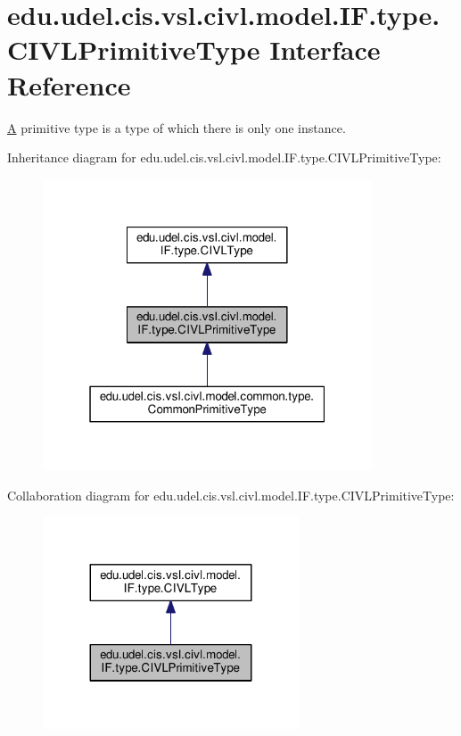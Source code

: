 \hypertarget{interfaceedu_1_1udel_1_1cis_1_1vsl_1_1civl_1_1model_1_1IF_1_1type_1_1CIVLPrimitiveType}{}\section{edu.\+udel.\+cis.\+vsl.\+civl.\+model.\+I\+F.\+type.\+C\+I\+V\+L\+Primitive\+Type Interface Reference}
\label{interfaceedu_1_1udel_1_1cis_1_1vsl_1_1civl_1_1model_1_1IF_1_1type_1_1CIVLPrimitiveType}


\hyperlink{structA}{A} primitive type is a type of which there is only one instance.  




Inheritance diagram for edu.\+udel.\+cis.\+vsl.\+civl.\+model.\+I\+F.\+type.\+C\+I\+V\+L\+Primitive\+Type\+:
\nopagebreak
\begin{figure}[H]
\begin{center}
\leavevmode
\includegraphics[width=277pt]{interfaceedu_1_1udel_1_1cis_1_1vsl_1_1civl_1_1model_1_1IF_1_1type_1_1CIVLPrimitiveType__inherit__graph}
\end{center}
\end{figure}


Collaboration diagram for edu.\+udel.\+cis.\+vsl.\+civl.\+model.\+I\+F.\+type.\+C\+I\+V\+L\+Primitive\+Type\+:
\nopagebreak
\begin{figure}[H]
\begin{center}
\leavevmode
\includegraphics[width=215pt]{interfaceedu_1_1udel_1_1cis_1_1vsl_1_1civl_1_1model_1_1IF_1_1type_1_1CIVLPrimitiveType__coll__graph}
\end{center}
\end{figure}
